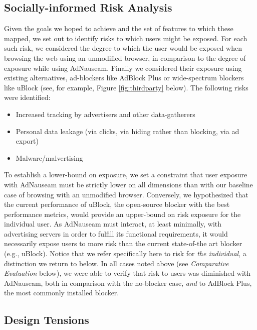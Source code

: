 \documentclass[conference]{IEEEtran}
\begin{document}
\subsection{Socially-informed Risk Analysis}

Given the goals we hoped to achieve and the set of features to which these mapped, we set out to identify risks to which users might be exposed. For each such risk, we considered the degree to which the user would be exposed when browsing the web using an unmodified browser, in comparison to the degree of exposure while using AdNauseam. Finally we considered their exposure using existing alternatives, ad-blockers like AdBlock Plus \cite{AdBlock} or wide-spectrum blockers like uBlock \cite{Gorhill}(see, for example, Figure \ref{fig:thirdparty} below). The following risks were identified:

\vspace{2mm}
\begin{itemize}
\item Increased tracking by advertisers and other data-gatherers
\item Personal data leakage (via clicks, via hiding rather than blocking, via ad export)
\item Malware/malvertising
\end{itemize}
\vspace{1mm}


\noindent To establish a lower-bound on exposure, we set a constraint that user exposure with AdNauseam must be strictly lower on all dimensions than with our baseline case of browsing with an unmodified browser. Conversely, we hypothesized that the current performance of uBlock, the open-source blocker with the best performance metrics, would provide an upper-bound on risk exposure for the individual user. As AdNauseam must interact, at least minimally, with advertising servers in order to fulfill its functional requirements, it would necessarily expose users to more risk than the current state-of-the art blocker (e.g., uBlock). Notice that we refer specifically here to risk for \emph{the individual}, a distinction we return to below. In all cases noted above (see \emph{Comparative Evaluation} below), we were able to verify that risk to users was diminished with AdNauseam, both in comparison with the no-blocker case, \emph{and} to AdBlock Plus, the most commonly installed blocker\cite{PageFair}.


\subsection{Design Tensions}
\end{document}
